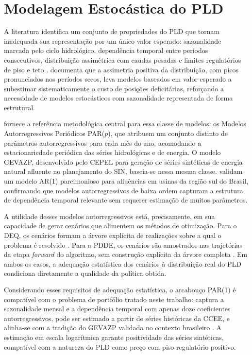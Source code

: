 \section{Modelagem Estocástica do PLD}
\label{sec:rl_pld}

A literatura identifica um conjunto de propriedades do PLD que tornam inadequada sua representação por um único valor esperado: sazonalidade marcada pelo ciclo hidrológico, dependência temporal entre períodos consecutivos, distribuição assimétrica com caudas pesadas e limites regulatórios de piso e teto \cite{guerreiro2017,ccee2024a,mme2002}.  documenta que a assimetria positiva da distribuição, com picos pronunciados nos períodos secos, leva modelos baseados em valor esperado a subestimar sistematicamente o custo de posições deficitárias, reforçando a necessidade de modelos estocásticos com sazonalidade representada de forma estrutural.

 fornece a referência metodológica central para essa classe de modelos: os Modelos Autorregressivos Periódicos PAR($p$), que atribuem um conjunto distinto de parâmetros autorregressivos para cada mês do ano, acomodando a estacionariedade periódica das séries hidrológicas e de energia. O modelo GEVAZP, desenvolvido pelo CEPEL para geração de séries sintéticas de energia natural afluente no planejamento do SIN, baseia-se nessa mesma classe. \cite{detzel2011} validam um modelo AR(1) parcimonioso para afluências em usinas da região sul do Brasil, confirmando que modelos autorregressivos de baixa ordem capturam a estrutura de dependência temporal relevante sem requerer estimação de muitos parâmetros.

A utilidade desses modelos autorregressivos está, precisamente, em sua capacidade de gerar cenários que alimentem os métodos de otimização. Para o DEQ, os cenários formam a árvore explícita de realizações sobre a qual o problema é resolvido \cite{birge2011}. Para a PDDE, os cenários são amostrados nas trajetórias da etapa \emph{forward} do algoritmo, sem construção explícita da árvore completa \cite{pereira1991,shapiro2009}. Em ambos os casos, a adequação estatística dos cenários à distribuição real do PLD condiciona diretamente a qualidade da política obtida.

Considerando esses requisitos de adequação estatística, o arcabouço PAR(1) é compatível com o problema de portfólio tratado neste trabalho: captura a sazonalidade mensal e a dependência temporal com apenas doze coeficientes autorregressivos, pode ser estimado a partir de séries históricas da CCEE, e alinha-se com a tradição do GEVAZP validada no contexto brasileiro \cite{reis2013,detzel2011}. A estimação em escala logarítmica garante positividade das séries sintéticas, compatível com a natureza do PLD como preço com piso regulatório positivo.
